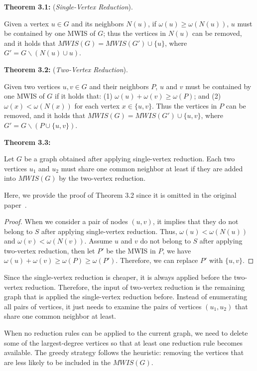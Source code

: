 \documentclass[sigconf, nonacm]{acmart}
\begin{document}
\begin{framed}
\noindent\textbf{Theorem 3.1:} (\emph{Single-Vertex Reduction}). 

Given a vertex $u\in G$ and its neighbors $N(u)$, if $\omega(u)\geq\omega(N(u))$, $u$ must be contained by one MWIS of $G$; thus the vertices in $N(u)$ can be removed, and it holds that $MWIS(G)=MWIS(G')\cup\{u\}$, where $G'= G\backslash(N(u)\cup u)$.

\noindent\textbf{Theorem 3.2:} (\emph{Two-Vertex Reduction}). 

Given two vertices $u, v\in G$ and their neighbors $P$, $u$ and $v$ must be contained by one MWIS of $G$ if it holds that: (1) $\omega(u)+\omega(v)\geq\omega(P)$; and (2) $\omega(x)<\omega(N(x))$ for each vertex $x\in\{u,v\}$. Thus the vertices in $P$ can be removed, and it holds that $MWIS(G)=MWIS(G')\cup\{u,v\}$, where $G'=G\backslash(P\cup\{u,v\})$.

\noindent\textbf{Theorem 3.3:}

Let $G$ be a graph obtained after applying single-vertex reduction. Each two vertices $u_1$ and $u_2$ must share one common neighbor at least if they are added into $MWIS(G)$ by the two-vertex reduction.
\end{framed}

Here, we provide the proof of Theorem 3.2 since it is omitted in the original paper~\cite{Zheng:2020aa}.

\begin{proof}
When we consider a pair of nodes $(u, v)$, it implies that they do not belong to $S$ after applying single-vertex reduction. Thus, $\omega(u)<\omega(N(u))$ and $\omega(v)<\omega(N(v))$. Assume $u$ and $v$ do not belong to $S$ after applying two-vertex reduction, then let $P'$ be the MWIS in $P$, we have $\omega(u)+\omega(v)\geq\omega(P)\geq\omega(P')$. Therefore, we can replace $P'$ with $\{u, v\}$. %
\end{proof}

Since the single-vertex reduction is cheaper, it is always applied before the two-vertex reduction. Therefore, the input of two-vertex reduction is the remaining graph that is applied the single-vertex reduction before. Instead of enumerating all pairs of vertices, it just needs to examine the pairs of vertices $(u_1, u_2)$ that share one common neighbor at least.

When no reduction rules can be applied to the current graph, we need to delete some of the largest-degree vertices so that at least one reduction rule becomes available. The greedy strategy follows the heuristic: removing the vertices that are less likely to be included in the $MWIS(G)$.
\end{document}

